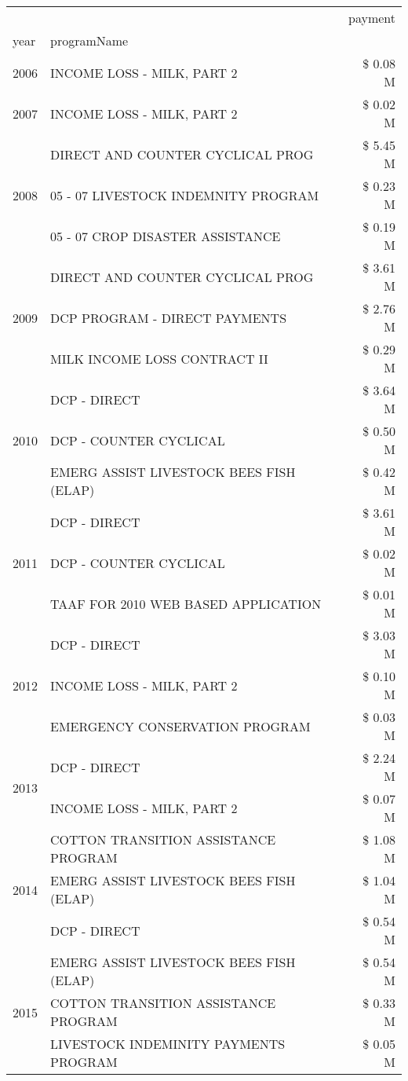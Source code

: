 \begin{tabular}{llr}
\toprule
 &  & payment \\
year & programName &  \\
\midrule
2006 & INCOME LOSS - MILK, PART 2 & \$ 0.08 M \\
\cline{1-3}
2007 & INCOME LOSS - MILK, PART 2 & \$ 0.02 M \\
\cline{1-3}
\multirow[t]{3}{*}{2008} & DIRECT AND COUNTER CYCLICAL PROG & \$ 5.45 M \\
 & 05 - 07 LIVESTOCK INDEMNITY PROGRAM & \$ 0.23 M \\
 & 05 - 07 CROP DISASTER ASSISTANCE & \$ 0.19 M \\
\cline{1-3}
\multirow[t]{3}{*}{2009} & DIRECT AND COUNTER CYCLICAL PROG & \$ 3.61 M \\
 & DCP PROGRAM - DIRECT PAYMENTS & \$ 2.76 M \\
 & MILK INCOME LOSS CONTRACT II & \$ 0.29 M \\
\cline{1-3}
\multirow[t]{3}{*}{2010} & DCP - DIRECT & \$ 3.64 M \\
 & DCP - COUNTER CYCLICAL & \$ 0.50 M \\
 & EMERG ASSIST LIVESTOCK BEES FISH (ELAP) & \$ 0.42 M \\
\cline{1-3}
\multirow[t]{3}{*}{2011} & DCP - DIRECT & \$ 3.61 M \\
 & DCP - COUNTER CYCLICAL & \$ 0.02 M \\
 & TAAF FOR 2010 WEB BASED APPLICATION & \$ 0.01 M \\
\cline{1-3}
\multirow[t]{3}{*}{2012} & DCP - DIRECT & \$ 3.03 M \\
 & INCOME LOSS - MILK, PART 2 & \$ 0.10 M \\
 & EMERGENCY CONSERVATION PROGRAM & \$ 0.03 M \\
\cline{1-3}
\multirow[t]{2}{*}{2013} & DCP - DIRECT & \$ 2.24 M \\
 & INCOME LOSS - MILK, PART 2 & \$ 0.07 M \\
\cline{1-3}
\multirow[t]{3}{*}{2014} & COTTON TRANSITION ASSISTANCE PROGRAM & \$ 1.08 M \\
 & EMERG ASSIST LIVESTOCK BEES FISH (ELAP) & \$ 1.04 M \\
 & DCP - DIRECT & \$ 0.54 M \\
\cline{1-3}
\multirow[t]{3}{*}{2015} & EMERG ASSIST LIVESTOCK BEES FISH (ELAP) & \$ 0.54 M \\
 & COTTON TRANSITION ASSISTANCE PROGRAM & \$ 0.33 M \\
 & LIVESTOCK INDEMINITY PAYMENTS PROGRAM & \$ 0.05 M \\

\end{tabular}
